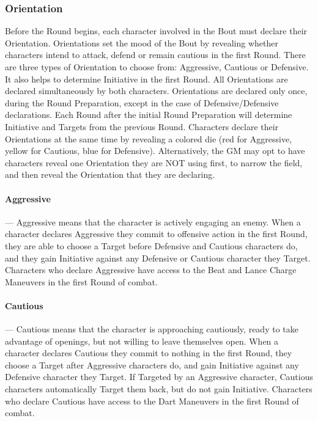 \documentclass[oneside,11pt,english]{book}
\begin{document}
\subsubsection{Orientation}
Before the Round begins, each character involved in the Bout must declare their Orientation.
Orientations set the mood of the Bout by revealing whether characters intend to attack, defend or remain
cautious in the first Round. There are three types of Orientation to choose from: Aggressive, Cautious or
Defensive. It also helps to determine Initiative in the first Round.
All Orientations are declared simultaneously by both characters. Orientations are declared only once,
during the Round Preparation, except in the case of Defensive/Defensive declarations. Each Round after
the initial Round Preparation will determine Initiative and Targets from the previous Round.
Characters declare their Orientations at the same time by revealing a colored die (red for Aggressive,
yellow for Cautious, blue for Defensive). Alternatively, the GM may opt to have characters reveal one
Orientation they are NOT using first, to narrow the field, and then reveal the Orientation that they are
declaring.

\paragraph{\label{par:Aggressive}Aggressive}---\quad
Aggressive means that the character is actively engaging an enemy. When a character declares
Aggressive they commit to offensive action in the first Round, they are able to choose a Target
before Defensive and Cautious characters do, and they gain Initiative against any Defensive or
Cautious character they Target. Characters who declare Aggressive have access to the Beat and
Lance Charge Maneuvers in the first Round of combat.
\paragraph{\label{par:Cautious}Cautious}---\quad
Cautious means that the character is approaching cautiously, ready to take advantage of openings,
but not willing to leave themselves open. When a character declares Cautious they commit to
nothing in the first Round, they choose a Target after Aggressive characters do, and gain Initiative
against any Defensive character they Target. If Targeted by an Aggressive character, Cautious
characters automatically Target them back, but do not gain Initiative. Characters who declare
Cautious have access to the Dart Maneuvers in the first Round of combat.
\end{document}
